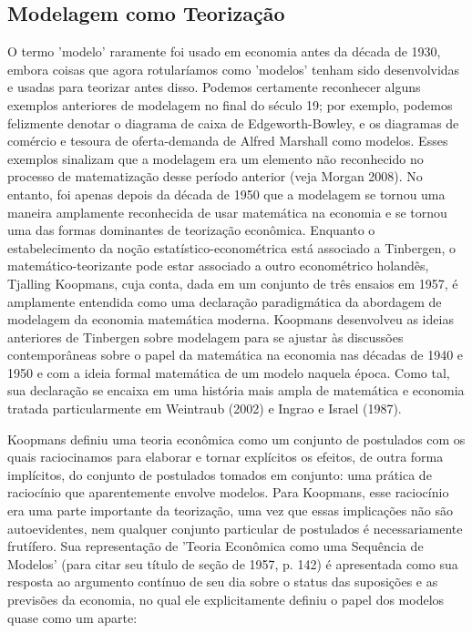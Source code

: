 \documentclass[a4paper,12pt]{article}[abntex2]
\begin{document}
\subsection{\textbf{Modelagem como Teorização}}
O termo 'modelo' raramente foi usado em economia antes da década de 1930, embora coisas que agora rotularíamos como 'modelos' tenham sido desenvolvidas e usadas para teorizar antes disso. Podemos certamente reconhecer alguns exemplos anteriores de modelagem no final do século 19; por exemplo, podemos felizmente denotar o diagrama de caixa de Edgeworth-Bowley, e os diagramas de comércio e tesoura de oferta-demanda de Alfred Marshall como modelos. Esses exemplos sinalizam que a modelagem era um elemento não reconhecido no processo de matematização desse período anterior (veja Morgan 2008). No entanto, foi apenas depois da década de 1950 que a modelagem se tornou uma maneira amplamente reconhecida de usar matemática na economia e se tornou uma das formas dominantes de teorização econômica. Enquanto o estabelecimento da noção estatístico-econométrica está associado a Tinbergen, o matemático-teorizante pode estar associado a outro econométrico holandês, Tjalling Koopmans, cuja conta, dada em um conjunto de três ensaios em 1957, é amplamente entendida como uma declaração paradigmática da abordagem de modelagem da economia matemática moderna. Koopmans desenvolveu as ideias anteriores de Tinbergen sobre modelagem para se ajustar às discussões contemporâneas sobre o papel da matemática na economia nas décadas de 1940 e 1950 e com a ideia formal matemática de um modelo naquela época. Como tal, sua declaração se encaixa em uma história mais ampla de matemática e economia tratada particularmente em Weintraub (2002) e Ingrao e Israel (1987).

Koopmans definiu uma teoria econômica como um conjunto de postulados com os quais raciocinamos para elaborar e tornar explícitos os efeitos, de outra forma implícitos, do conjunto de postulados tomados em conjunto: uma prática de raciocínio que aparentemente envolve modelos. Para Koopmans, esse raciocínio era uma parte importante da teorização, uma vez que essas implicações não são autoevidentes, nem qualquer conjunto particular de postulados é necessariamente frutífero. Sua representação de 'Teoria Econômica como uma Sequência de Modelos' (para citar seu título de seção de 1957, p. 142) é apresentada como sua resposta ao argumento contínuo de seu dia sobre o status das suposições e as previsões da economia, no qual ele explicitamente definiu o papel dos modelos quase como um aparte:
\end{document}
